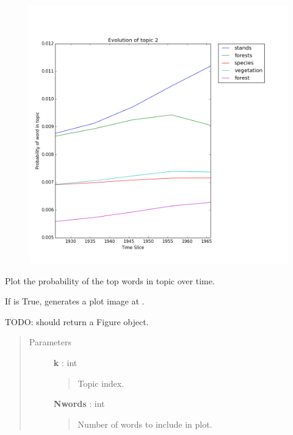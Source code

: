\documentclass[letterpaper,10pt,english]{sphinxmanual}
\begin{document}
\begin{fulllineitems}
\begin{figure}[htbp]
\includegraphics{topic_2_evolution.png}
\end{figure}

\begin{fulllineitems}
\label{tethne.model.managers.dtm:tethne.model.managers.dtm.DTMModelManager.plot_topic_evolution}
Plot the probability of the top  words in topic  over
time.

If  is True, generates a plot image at .

TODO: should return a Figure object.
\begin{quote}\begin{description}
\item[{Parameters}] \leavevmode
\textbf{k} : int
\begin{quote}

Topic index.
\end{quote}

\textbf{Nwords} : int
\begin{quote}

Number of words to include in plot.
\end{quote}


\end{description}
\end{quote}
\end{fulllineitems}
\end{fulllineitems}
\end{document}
